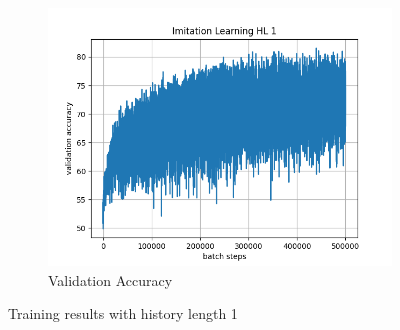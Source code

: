 \documentclass[10pt]{scrartcl}
\begin{document}
\begin{figure}[h]
\begin{subfigure}{0.5\textwidth}
      \includegraphics[width=\linewidth]{images/Il_hl1_valid.png}
      \caption{Validation Accuracy}
      \label{fig:Il_hl1_valid}
    \end{subfigure}
    \caption{Training results with history length 1}
    \label{fig:Il_hl1}
\end{figure}
\end{document}
